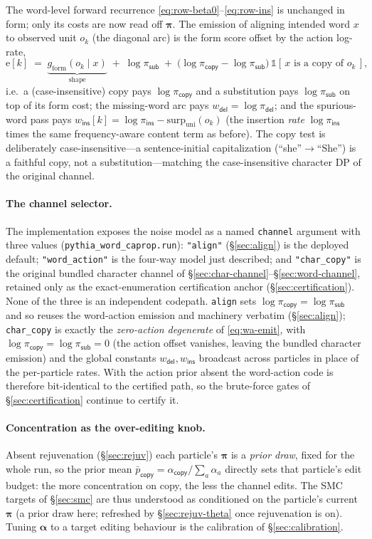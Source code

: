 \documentclass[11pt]{article}
\providecommand{\Ind}{\mathbb{1}}
\providecommand{\given}{\mid}
\providecommand{\copyact}{\textsf{copy}}
\providecommand{\subact}{\textsf{sub}}
\providecommand{\insact}{\textsf{ins}}
\providecommand{\delact}{\textsf{del}}
\providecommand{\code}[1]{\texttt{#1}}
\providecommand{\chan}{g}            %
\providecommand{\wdel}{w_{\delact}}
\providecommand{\wins}{w_{\insact}}
\providecommand{\actdist}{\bm{\pi}}            %
\providecommand{\pcopy}{\pi_{\copyact}}
\providecommand{\psub}{\pi_{\subact}}
\providecommand{\pins}{\pi_{\insact}}
\providecommand{\pdel}{\pi_{\delact}}
\begin{document}
The word-level forward recurrence \eqref{eq:row-beta0}--\eqref{eq:row-ins} is unchanged in form; only its costs are now read off $\actdist$. The emission of aligning intended word $x$ to observed unit $o_k$ (the diagonal arc) is the form score offset by the action log-rate,
\begin{equation}\label{eq:wa-emit}
  \mathrm{e}[k] \;=\; \underbrace{\chan_{\mathrm{form}}(o_k\given x)}_{\text{shape}}
     \;+\; \log\psub \;+\; \big(\log\pcopy - \log\psub\big)\,\Ind[\,x \text{ is a copy of } o_k\,],
\end{equation}
i.e.\ a (case-insensitive) copy pays $\log\pcopy$ and a substitution pays $\log\psub$ on top of its form cost; the missing-word arc pays $\wdel = \log\pdel$; and the spurious-word pass pays $\wins[k] = \log\pins - \mathrm{surp}_{\mathrm{uni}}(o_k)$ (the insertion \emph{rate} $\log\pins$ times the same frequency-aware content term as before). The copy test is deliberately case-insensitive---a sentence-initial capitalization (``she''$\to$``She'') is a faithful copy, not a substitution---matching the case-insensitive character DP of the original channel.

\paragraph{The channel selector.} The implementation exposes the noise model as a named \code{channel} argument with three values (\code{pythia\_word\_caprop.run}): \code{"align"} (\S\ref{sec:align}) is the deployed default; \code{"word\_action"} is the four-way model just described; and \code{"char\_copy"} is the original bundled character channel of \S\ref{sec:char-channel}--\S\ref{sec:word-channel}, retained only as the exact-enumeration certification anchor (\S\ref{sec:certification}). None of the three is an independent codepath. \code{align} sets $\log\pcopy=\log\psub$ and so reuses the word-action emission and machinery verbatim (\S\ref{sec:align}); \code{char\_copy} is exactly the \emph{zero-action degenerate} of \eqref{eq:wa-emit}, with $\log\pcopy = \log\psub = 0$ (the action offset vanishes, leaving the bundled character emission) and the global constants $\wdel,\wins$ broadcast across particles in place of the per-particle rates. With the action prior absent the word-action code is therefore bit-identical to the certified path, so the brute-force gates of \S\ref{sec:certification} continue to certify it.

\paragraph{Concentration as the over-editing knob.} Absent rejuvenation (\S\ref{sec:rejuv}) each particle's $\actdist$ is a \emph{prior draw}, fixed for the whole run, so the prior mean $\bar p_{\copyact} = \alpha_{\copyact}/\!\sum_a \alpha_a$ directly sets that particle's edit budget: the more concentration on copy, the less the channel edits. The SMC targets of \S\ref{sec:smc} are thus understood as conditioned on the particle's current $\actdist$ (a prior draw here; refreshed by \S\ref{sec:rejuv-theta} once rejuvenation is on). Tuning $\bm\alpha$ to a target editing behaviour is the calibration of \S\ref{sec:calibration}.
\end{document}
